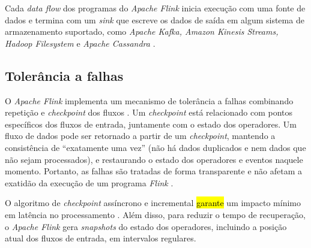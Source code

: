 Cada \emph{data flow} dos programas do \emph{Apache Flink} inicia execução com uma fonte
de dados e termina com um \emph{sink} que escreve os dados de saída em algum
sistema de armazenamento suportado, como \emph{Apache Kafka, Amazon Kinesis Streams,
Hadoop Filesystem} e \emph{Apache Cassandra} \cite{ApacheFlink2020}.


\subsection{Tolerância a falhas}

O \emph{Apache Flink} implementa um mecanismo de tolerância a falhas combinando repetição e
\emph{checkpoint} dos fluxos \cite{Carbone2015,ApacheFlink2020}.
Um \emph{checkpoint} está relacionado com pontos específicos dos fluxos de
entrada, juntamente com o estado dos operadores.
Um fluxo de dados pode ser retornado a partir de um \emph{checkpoint}, mantendo
a consistência de ``exatamente uma vez'' (não há dados duplicados e nem dados que
não sejam processados), e restaurando o estado dos operadores e eventos naquele
momento.
Portanto, as falhas são tratadas de forma transparente e não afetam a exatidão
da execução de um programa \emph{Flink} \cite{ApacheFlink2020}.

O algoritmo de \emph{checkpoint} assíncrono e incremental \hl{garante} um impacto
mínimo em latência no processamento \cite{Carbone2015}.
Além disso, para reduzir o tempo de recuperação, o \emph{Apache Flink} gera
\emph{snapshots} do estado dos operadores, incluindo a posição atual dos fluxos
de entrada, em intervalos regulares.


